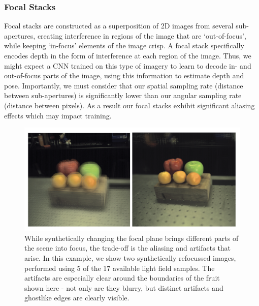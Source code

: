 \subsubsection{Focal Stacks}
Focal stacks are constructed as a superposition of 2D images from several sub-apertures, creating interference in regions of the image that are `out-of-focus', while keeping `in-focus' elements of the image crisp. A focal stack specifically encodes depth in the form of interference at each region of the image. Thus, we might expect a CNN trained on this type of imagery to learn to decode in- and out-of-focus parts of the image, using this information to estimate depth and pose. Importantly, we must consider that our spatial sampling rate (distance between sub-apertures) is significantly lower than our angular sampling rate (distance between pixels). As a result our focal stacks exhibit significant aliasing effects which may impact training.

\begin{figure}[h]
    \centering
    \includegraphics[width=\textwidth]{images/fruitfocus.png}
    \caption[Artifacts from synthetic refocusing]{While synthetically changing the focal plane brings different parts of the scene into focus, the trade-off is the aliasing and artifacts that arise. In this example, we show two synthetically refocussed images, performed using 5 of the 17 available light field samples. The artifacts are especially clear around the boundaries of the fruit shown here - not only are they blurry, but distinct artifacts and ghostlike edges are clearly visible.}
\end{figure}

